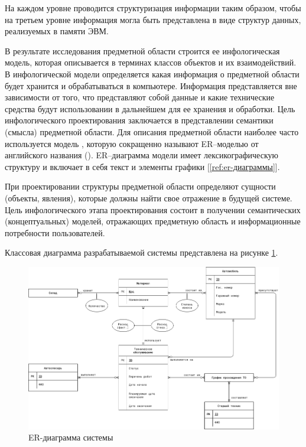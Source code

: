 \documentclass[../nirs.tex]{subfiles}
\begin{document}
На каждом уровне проводится структуризация информации таким образом, чтобы на
третьем уровне информация могла быть представлена в виде структур данных,
реализуемых в памяти ЭВМ.

В результате исследования предметной области строится ее инфологическая модель,
которая описывается в терминах классов объектов и их взаимодействий. В
инфологической модели определяется какая информация о предметной области будет
хранится и обрабатываться в компьютере. Информация представляется вне
зависимости от того, что представляют собой данные и какие технические средства
будут использовании в дальнейшем для ее хранения и обработки. Цель инфологического
проектирования заключается в представлении семантики (смысла) предметной
области. Для описания предметной области наиболее часто используется модель
, которую сокращенно называют ER–моделью от
английского названия  (). ER–диаграмма модели имеет лексикографическую структуру и включает в
себя текст и элементы графики [\ref{ref:er-диаграммы}].

При проектировании структуры предметной области определяют сущности (объекты,
явления), которые должны найти свое отражение в будущей системе.
Цель инфологического этапа проектирования состоит в получении семантических
(концептуальных) моделей, отражающих предметную область и информационные
потребности пользователей.

Классовая диаграмма разрабатываемой системы представлена на рисунке
\ref{fig:2_1_er_diagram}.

\begin{figure}
	\centering
	\includegraphics[keepaspectratio,
                     width=\textwidth,
                     height=0.6\textheight]{./images/er-diagram.drawio.png}
	\caption{ER-диаграмма системы}
	\label{fig:2_1_er_diagram}
\end{figure}
\end{document}
